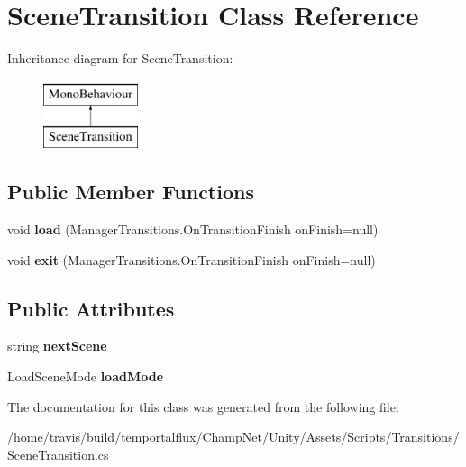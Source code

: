 \hypertarget{class_scene_transition}{\section{Scene\-Transition Class Reference}
\label{class_scene_transition}
}
Inheritance diagram for Scene\-Transition\-:\begin{figure}[H]
\begin{center}
\leavevmode
\includegraphics[height=2.000000cm]{class_scene_transition}
\end{center}
\end{figure}
\subsection*{Public Member Functions}
\begin{DoxyCompactItemize}
\item 
\hypertarget{class_scene_transition_ac0f7927206a866304c59c6f9d64db781}{void {\bfseries load} (Manager\-Transitions.\-On\-Transition\-Finish on\-Finish=null)}\label{class_scene_transition_ac0f7927206a866304c59c6f9d64db781}

\item 
\hypertarget{class_scene_transition_a1c56080a413a75527ecc5aaea65d5897}{void {\bfseries exit} (Manager\-Transitions.\-On\-Transition\-Finish on\-Finish=null)}\label{class_scene_transition_a1c56080a413a75527ecc5aaea65d5897}

\end{DoxyCompactItemize}
\subsection*{Public Attributes}
\begin{DoxyCompactItemize}
\item 
\hypertarget{class_scene_transition_a38658b7f48d29d07b9d79a9b77bbb4ee}{string {\bfseries next\-Scene}}\label{class_scene_transition_a38658b7f48d29d07b9d79a9b77bbb4ee}

\item 
\hypertarget{class_scene_transition_a5b140f4b742c3d71eaaedbee3a52a588}{Load\-Scene\-Mode {\bfseries load\-Mode}}\label{class_scene_transition_a5b140f4b742c3d71eaaedbee3a52a588}

\end{DoxyCompactItemize}


The documentation for this class was generated from the following file\-:\begin{DoxyCompactItemize}
\item 
/home/travis/build/temportalflux/\-Champ\-Net/\-Unity/\-Assets/\-Scripts/\-Transitions/Scene\-Transition.\-cs\end{DoxyCompactItemize}
